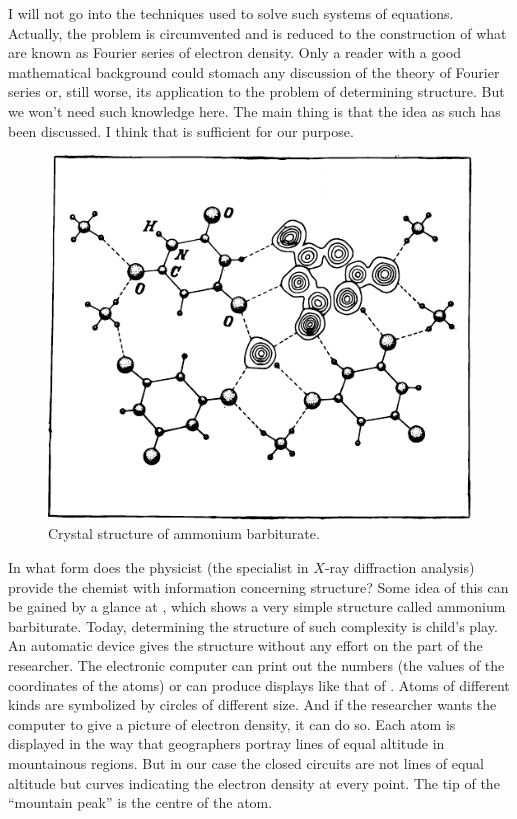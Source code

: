 I will not go into the techniques used to solve such systems of equations. Actually, the problem is circumvented and is reduced to the construction of what are known as Fourier series of electron density. Only a reader with a good mathematical background could stomach any discussion of the theory of Fourier series or, still worse, its application to the problem of determining structure. But we won't need such knowledge here. The main thing is that the idea as such has been discussed. I think that is sufficient for our purpose.
\begin{figure}[!ht]
\centering
\includegraphics[width=\textwidth]{figures/fig-03-03.pdf}
\caption{Crystal structure of ammonium barbiturate.}
\label{fig-3.3}
\end{figure}
In what form does the physicist (the specialist in $X$-ray diffraction analysis) provide the chemist with informa­tion concerning structure? Some idea of this can be gained by a glance at , which shows a very simple structure called ammonium barbiturate. Today, determin­ing the structure of such complexity is child's play. An automatic device gives the structure without any effort on the part of the researcher. The electronic computer can print out the numbers (the values of the coordinates of the atoms) or can produce displays like that of . Atoms of different kinds are symbolized by circles of different size. And if the researcher wants the computer to give a picture of electron density, it can do so. Each atom is displayed in the way that geographers portray lines of equal altitude in mountainous regions. But in our case the closed circuits are not lines of equal altitude but curves indicating the electron density at every point. The tip of the ``mountain peak'' is the centre of the atom.

